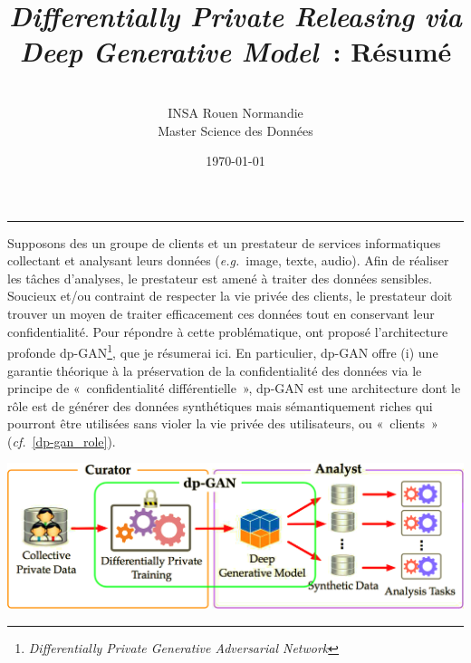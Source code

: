 \documentclass[a4paper,11pt]{article}
\title{\Large\bfseries\textit{Differentially Private Releasing via Deep Generative Model} : Résumé}
\author{\textbf{\AH}\\{\small INSA Rouen Normandie\\Master Science des Données}}
\date{\today}
\newenvironment{colfig}{\par\medskip\noindent\minipage{\linewidth}}{\endminipage\par\medskip}
\theoremstyle{definition}
\newcommand{\eg}{\textit{e.g.}}
\newcommand{\cf}{\textit{cf.}}
\begin{document}
\maketitle
\hrule height 1.6pt



\begin{multicols}{2}

Supposons des un groupe de clients et un prestateur de services informatiques collectant et analysant leurs données (\eg\ image, texte, audio). Afin de réaliser les tâches d'analyses, le prestateur est amené à traiter des données sensibles. Soucieux et/ou contraint de respecter la vie privée des clients, le prestateur doit trouver un moyen de traiter efficacement ces données tout en conservant leur confidentialité. Pour répondre à cette problématique, \citet{2018arXiv180101594Z} ont proposé l'architecture profonde dp-GAN\footnote{\textit{Differentially Private Generative Adversarial Network}}, que je résumerai ici. En particulier, dp-GAN offre (i) une garantie théorique à la préservation de la confidentialité des données via le principe de « confidentialité différentielle », \textcolor{(ii) retient  it retains desirable utility in the released model, enabling a variety of oth-erwise impossible analyses, et (iii) most importantly, it achieves practical training scalability and stability by employing multi-fold optimization strategies.}

dp-GAN est une architecture dont le rôle est de générer des données synthétiques mais sémantiquement riches qui pourront être utilisées sans violer la vie privée des utilisateurs, ou « clients » (\cf\ \autoref{dp-gan_role}).

\begin{colfig}
    \centering
    \includegraphics[width=\textwidth]{dp-gan_role.png}
    \label{dp-gan_role}
\end{colfig}

\printbibliography[title=Références] %

\end{multicols}
\end{document}

